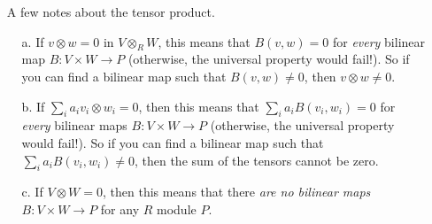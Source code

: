 \documentclass[12pt]{article}
\begin{document}
\pagestyle{fancy}

\begin{enumerate}
\item[]\ A few notes about the tensor product. 
\begin{itemize}
\item[a.] If $v\otimes w=0$ in $V\otimes_R W$, this means that $B(v,w)=0$
  for \emph{every} bilinear map $B: V\times W \rightarrow P$ (otherwise,
  the universal property would fail!). So if you can find a bilinear
  map such that $B(v,w)\neq 0$, then $v\otimes w \neq 0$.
\item[b.] If $\sum_i a_i v_i \otimes w_i=0$, then this means that $\sum_i
  a_i B(v_i,w_i)=0$ for \emph{every} bilinear maps $B: V\times W \rightarrow P$
  (otherwise, the universal property would fail!). So if you can find
  a bilinear map such that $\sum_i a_i B(v_i,w_i)\neq 0$, then the sum
  of the tensors cannot be zero.
\item[c.] If $V\otimes W=0$, then this means that there \emph{are no
    bilinear maps} $B: V\times W \rightarrow P$ for any $R$ module
  $P$. 
\end{itemize}
\end{enumerate}
\end{document}

